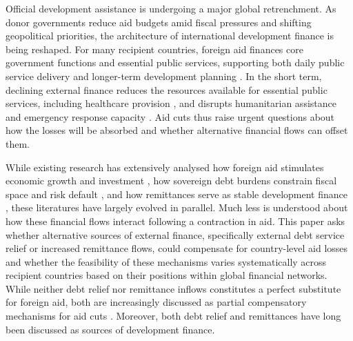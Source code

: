 \documentclass[fleqn,10pt,twocolumn]{wlscirep}
\begin{document}
{

Official development assistance is undergoing a major global retrenchment. As donor governments reduce aid budgets amid fiscal pressures and shifting geopolitical priorities, the architecture of international development finance is being reshaped. For many recipient countries, foreign aid finances core government functions and essential public services, supporting both daily public service delivery and longer-term development planning \cite{marc2017impact, OECD2024}. In the short term, declining external finance reduces the resources available for essential public services, including healthcare provision \cite{da2026impact}, and disrupts humanitarian assistance and emergency response capacity \cite{mbah2025impact}. Aid cuts thus raise urgent questions about how the losses will be absorbed and whether alternative financial flows can offset them.

While existing research has extensively analysed how foreign aid stimulates economic growth and investment \cite{clemens2012counting}, how sovereign debt burdens constrain fiscal space and risk default \cite{panizza2009economics}, and how remittances serve as stable development finance \cite{ratha2005workers}, these literatures have largely evolved in parallel. Much less is understood about how these financial flows interact following a contraction in aid. This paper asks whether alternative sources of external finance, specifically external debt service relief or increased remittance flows, could compensate for country-level aid losses and whether the feasibility of these mechanisms varies systematically across recipient countries based on their positions within global financial networks. While neither debt relief nor remittance inflows constitutes a perfect substitute for foreign aid, both are increasingly discussed as partial compensatory mechanisms for aid cuts \cite{miliband_2025, cgdev_remittances_aid_cuts_2025}. Moreover, both debt relief \cite{addison2005aid, cordella2013give} and remittances \cite{bertram1986sustainable, poirine1998should} have long been discussed as sources of development finance.
}
\end{document}
